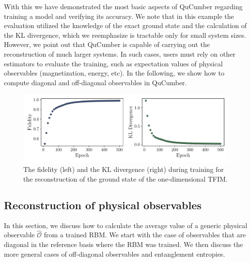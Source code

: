 \documentclass[submission, Phys, hidelnks]{SciPost}
\begin{document}
With this we have demonstrated the most basic aspects of QuCumber regarding
training a model and verifying its accuracy. We note that in this example the
evaluation utilized the knowledge of the exact ground state and the calculation
of the KL divergence, which we reemphasize is tractable only for small system sizes.  However,
we point out that QuCumber is capable of carrying out the reconstruction of much
larger systems. In such cases, users must rely on other estimators to evaluate
the training, such as expectation values of physical observables (magnetization,
energy, etc). In the following, we show how to compute diagonal and
off-diagonal observables in QuCumber.

\begin{figure}[hbt]
    \centering{}
    \includegraphics[width=\columnwidth, trim={0 15 0 0}, clip]{fid_KL.pdf}
    \caption{
        The fidelity (left) and the KL divergence (right) during training for
        the reconstruction of the ground state of the one-dimensional TFIM.\@
    }\label{fig:KL}
\end{figure}

\subsection{Reconstruction of physical observables}\label{Sec:Sampling_a-Trained_RBM}
In this section, we discuss how to calculate the average value of a generic
physical observable $\hat{\mathcal{O}}$ from a trained RBM.\@
We start with the case of observables that are diagonal in the reference basis
where the RBM was trained. We then discuss the more general cases of
off-diagonal observables and entanglement entropies.
\end{document}
